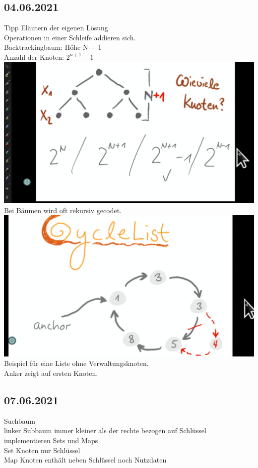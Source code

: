 \documentclass{article}
\begin{document}
 	\subsection*{04.06.2021}
 	Tipp Eläutern der eigenen Lösung \\
 	Operationen in einer Schleife addieren sich. \\
 	Backtrackingbaum: Höhe N + 1 \\
 	Anzahl der Knoten: $2^{n+1} - 1$ \\
 	\includegraphics[width=\linewidth]{baum}
 	\\
 	Bei Bäumen wird oft rekursiv gecodet. \\
 	\includegraphics[width=\linewidth]{CList} \\
 	Beispiel für eine Liste ohne Verwaltungsknoten. \\
 	Anker zeigt auf ersten Knoten. \\
 	\subsection*{07.06.2021}
 	Suchbaum \\
 	linker Subbaum immer kleiner als der rechte bezogen auf Schlüssel \\
 	implementieren Sets und Maps \\
 	Set Knoten nur Schlüssel \\
 	Map Knoten enthält neben Schlüssel noch Nutzdaten \\
\end{document}
